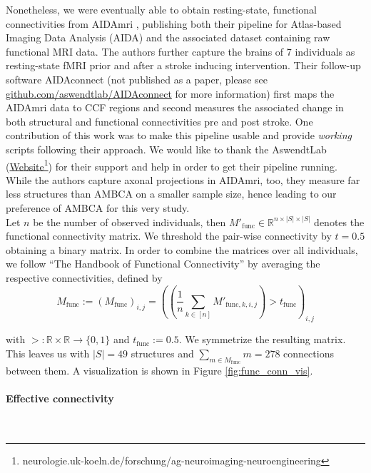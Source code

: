\documentclass[]{article}
\renewcommand{\cite}{\citep}
\begin{document}
Nonetheless, we were eventually able to obtain resting-state, functional connectivities from AIDAmri \cite{AIDAmri2019}, publishing both their pipeline for Atlas-based Imaging Data Analysis (AIDA) and the associated dataset containing raw functional MRI data. The authors further capture the brains of 7 individuals as resting-state fMRI prior and after a stroke inducing intervention. Their follow-up software AIDAconnect (not published as a paper, please see \href{https://github.com/aswendtlab/AIDAconnect}{github.com/aswendtlab/AIDAconnect} for more information) first maps the AIDAmri data to CCF regions and second measures the associated change in both structural and functional connectivities pre and post stroke. One contribution of this work was to make this pipeline usable and provide \textit{working} scripts following their approach. We would like to thank the AswendtLab (\href{https://neurologie.uk-koeln.de/forschung/ag-neuroimaging-neuroengineering/}{Website}\footnote{neurologie.uk-koeln.de/forschung/ag-neuroimaging-neuroengineering}) for their support and help in order to get their pipeline running. 
While the authors capture axonal projections in AIDAmri, too, they measure far less structures than AMBCA on a smaller sample size, hence leading to our preference of AMBCA for this very study. \\

Let $n$ be the number of observed individuals, then $M'_{\text{func}}\in\mathbb{R}^{n\times|S|\times|S|}$ denotes the functional connectivity matrix. We threshold the pair-wise connectivity by $t=0.5$ obtaining a binary matrix. In order to combine the matrices over all individuals, we follow ``The Handbook of Functional Connectivity'' \cite{nieto2020handbook} by averaging the respective connectivities, defined by 
\begin{equation}
	M_{\text{func}}:= \left(M_{\text{func}}\right)_{i,j} = \left(\left(\frac{1}{n}\sum_{k\in [n]}M'_{\text{func}, k,i,j}\right) > t_{\text{func}}\right)_{i,j}
\end{equation}

with $>:\mathbb{R}\times\mathbb{R}\rightarrow \{0,1\} $ and $t_{\text{func}}:=0.5$. We symmetrize the resulting matrix. This leaves us with $|S|=49$ structures and $\sum_{m\in M_{\text{func}} }m=278$ connections between them. A visualization is shown in Figure \ref{fig:func_conn_vis}.


\paragraph{Effective connectivity} \mbox{}\\
\label{sec:eff_conn}
\end{document}
